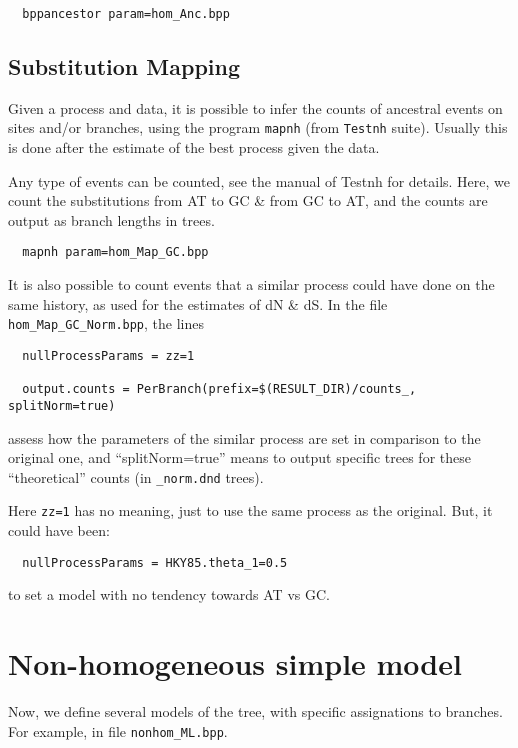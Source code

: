 \documentclass{article}
\begin{document}
\begin{verbatim}
  bppancestor param=hom_Anc.bpp
\end{verbatim}

\subsection*{Substitution Mapping}

Given a process and data, it is possible to infer the counts of
ancestral events on sites and/or branches, using the program
\texttt{mapnh} (from \texttt{Testnh} suite). Usually this is done
after the estimate of the best process given the data.

Any type of events can be counted, see the manual of Testnh for
details. Here, we count the substitutions from AT to GC \& from GC to
AT, and the counts are output as branch lengths in trees. 

\begin{verbatim}
  mapnh param=hom_Map_GC.bpp
\end{verbatim}

It is also possible to count events that a similar process could have
done on the same history, as used for the estimates of dN \& dS. In the
file \texttt{hom\_Map\_GC\_Norm.bpp}, the lines


\begin{verbatim}
  nullProcessParams = zz=1

  output.counts = PerBranch(prefix=$(RESULT_DIR)/counts_, splitNorm=true)
\end{verbatim}

assess how the parameters of the similar process are set in comparison
to the original one, and ``splitNorm=true'' means to output specific
trees for these ``theoretical'' counts (in \texttt{\_norm.dnd} trees).

Here \texttt{zz=1} has no meaning, just to use the same process as the
original. But, it could have been:

\begin{verbatim}
  nullProcessParams = HKY85.theta_1=0.5
\end{verbatim}

to set a model with no tendency towards AT vs GC.


\section{Non-homogeneous simple model}

Now, we define several models of the tree, with specific assignations
to branches. For example, in file \verb#nonhom_ML.bpp#.
\end{document}

